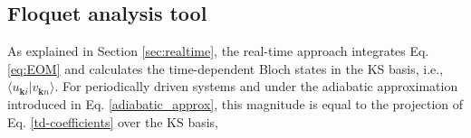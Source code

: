 \documentclass[aps,physrev,preprint,groupedaddress]{revtex4-2}
\newcommand{\tdKS}{|v_{\mathbf{k}n}\rangle}
\renewcommand{\[}{\left[}
\renewcommand{\]}{\right]}
\renewcommand{\(}{\left(}
\renewcommand{\)}{\right)}
\begin{document}

\subsection{\label{sec:FloqAn} Floquet analysis tool}
As explained in Section \ref{sec:realtime}, the real-time approach integrates Eq. \ref{eq:EOM} and calculates the time-dependent Bloch states in the KS basis, i.e., $\langle u_{\mathbf{k}i}\tdKS$. For periodically driven systems and under the adiabatic approximation introduced in Eq. \ref{adiabatic_approx}, this magnitude is equal to the projection of Eq. \ref{td-coefficients} over the KS basis,
\end{document}
